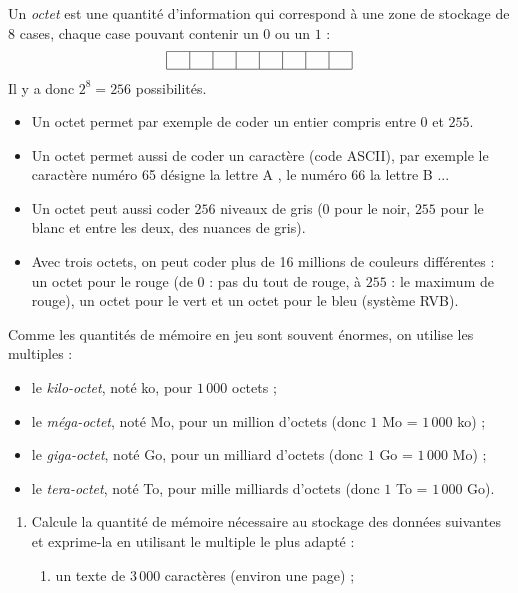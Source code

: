 \documentclass[class=report,crop=false, 12pt]{standalone}
\begin{document}
\begin{activite}
Un \emph{octet} est une quantité d'information qui correspond à une zone de stockage de $8$ cases, chaque case pouvant contenir un $0$ ou un $1$ :
   $$\begin{array}{|c|c|c|c|c|c|c|c|}
  \hline
    \ \   &  \ \  & \ \  & \ \  & \ \   &  \ \  & \ \  & \ \ \\ 
  \hline
\end{array}
$$
Il y a donc $2^8 = 256$ possibilités. 
\begin{itemize}
  \item Un octet permet par exemple de coder un entier compris entre $0$ et $255$. 
  \item Un octet permet aussi de coder un caractère (code ASCII), par exemple le caractère numéro 65 désigne la lettre \og A \fg{}, le numéro 66 la lettre \og B \fg{}... 
  \item Un octet peut aussi coder $256$ niveaux de gris ($0$ pour le noir, $255$ pour le blanc et entre les deux, des nuances de gris).
  \item Avec trois octets, on peut coder plus de 16 millions de couleurs différentes :
  un octet pour le rouge (de $0$ : pas du tout de rouge, à $255$ : le maximum de rouge), un octet pour le vert et un octet pour le bleu (système RVB).
\end{itemize}  

Comme les quantités de mémoire en jeu sont souvent énormes, on utilise les multiples :
\begin{itemize}
  \item le \emph{kilo-octet}, noté ko, pour $1\,000$ octets ;
  \item le \emph{méga-octet}, noté Mo, pour un million d'octets (donc $1$ Mo = $1\,000$ ko) ;
  \item le \emph{giga-octet}, noté Go, pour un milliard d'octets (donc $1$ Go = $1\,000$ Mo) ; 
  \item le \emph{tera-octet}, noté To, pour mille milliards d'octets (donc $1$ To = $1\,000$ Go).
\end{itemize}

\begin{enumerate}
  \item Calcule la quantité de mémoire nécessaire au stockage des données suivantes et exprime-la en utilisant le multiple le plus adapté :
  \begin{enumerate}
    \item un texte de $3\,000$ caractères (environ une page) ;
    

\end{enumerate}
\end{enumerate}
\end{activite}
\end{document}
